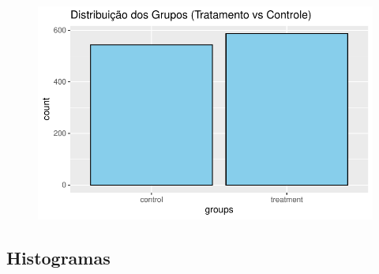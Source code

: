 \documentclass[
  letterpaper,
  DIV=11,
  numbers=noendperiod]{scrartcl}
\begin{document}
\begin{figure}[H]

{\centering \includegraphics{maps_files/figure-pdf/unnamed-chunk-15-1.pdf}

}

\end{figure}

\hypertarget{histogramas}{%
\subsection{Histogramas}\label{histogramas}}
\end{document}
